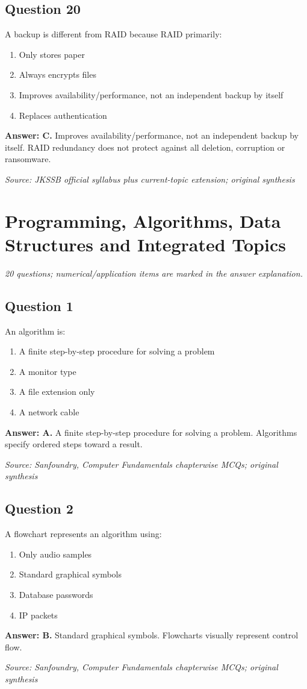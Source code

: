 \documentclass[11pt,a4paper]{book}
\newcommand{\source}[1]{\par\smallskip\textit{Source: #1}}
\newcommand{\answer}[2]{\par\textbf{Answer: #1.} #2}
\begin{document}
\section*{Question 20}
A backup is different from RAID because RAID primarily:
\begin{enumerate}[label=\Alph*.]
\item Only stores paper
\item Always encrypts files
\item Improves availability/performance, not an independent backup by itself
\item Replaces authentication
\end{enumerate}
\answer{C}{Improves availability/performance, not an independent backup by itself. RAID redundancy does not protect against all deletion, corruption or ransomware.}
\source{JKSSB official syllabus plus current-topic extension; original synthesis}

\chapter{Programming, Algorithms, Data Structures and Integrated Topics}
\textit{20 questions; numerical/application items are marked in the answer explanation.}
\section*{Question 1}
An algorithm is:
\begin{enumerate}[label=\Alph*.]
\item A finite step-by-step procedure for solving a problem
\item A monitor type
\item A file extension only
\item A network cable
\end{enumerate}
\answer{A}{A finite step-by-step procedure for solving a problem. Algorithms specify ordered steps toward a result.}
\source{Sanfoundry, Computer Fundamentals chapterwise MCQs; original synthesis}
\section*{Question 2}
A flowchart represents an algorithm using:
\begin{enumerate}[label=\Alph*.]
\item Only audio samples
\item Standard graphical symbols
\item Database passwords
\item IP packets
\end{enumerate}
\answer{B}{Standard graphical symbols. Flowcharts visually represent control flow.}
\source{Sanfoundry, Computer Fundamentals chapterwise MCQs; original synthesis}
\end{document}
